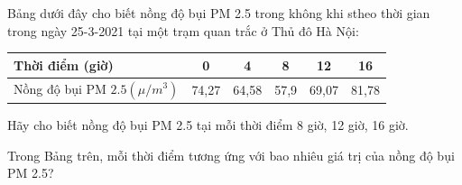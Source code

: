 \begin{bt}%
	Bảng dưới đây cho biết nồng độ bụi PM 2.5 trong không khi stheo thời gian trong ngày 25-3-2021 tại một trạm quan trắc ở Thủ đô Hà Nội:
	\begin{center}
		\begin{tabular}{|l|c|c|c|c|c|}
			\hline 
			Thời điểm (giờ) & 0 & 4 & 8 & 12 & 16 \\
			\hline 
			Nồng độ bụi PM $2.5(\mu/m^3)$ & 74,27 & 64,58 & 57,9 & 69,07 & 81,78 \\
			\hline
		\end{tabular}
	\end{center}
	\begin{listEX}[1]
		\item Hãy cho biết nồng độ bụi PM 2.5 tại mỗi thời điểm 8 giờ, 12 giờ, 16 giờ.
		\item Trong Bảng trên, mỗi thời điểm tương ứng với bao nhiêu giá trị của nồng độ bụi PM 2.5?
	\end{listEX}
\end{bt}

